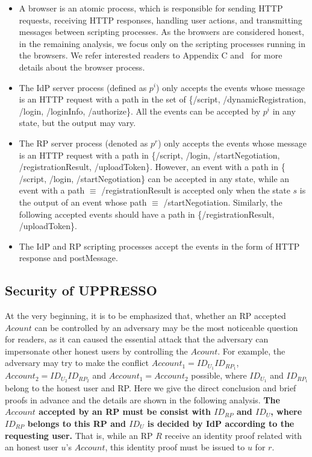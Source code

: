 \begin{itemize}
\item A browser is an atomic process, which is responsible for sending HTTP requests, receiving HTTP responses, handling user actions, and transmitting messages between scripting processes. As the browsers are considered honest, in the remaining analysis, we focus only on the scripting processes running in the browsers. We refer interested readers to Appendix C and~\cite{SPRESSO} for more details about the browser process.
\item The IdP server process (defined as $p^i$) only accepts the events whose message is an HTTP request with a path in the set of {\sf \{/script, /dynamicRegistration, /login, /loginInfo, /authorize\}}. %
All the events can be accepted by $p^i$ in any state, but the output may vary. %
\item The RP server process (denoted as $p^r$) only accepts the events whose message is an HTTP request with a path in {\sf \{/script, /login, /startNegotiation, /registrationResult, /uploadToken\}}. %
However, an event with a path in {\sf \{ /script, /login, /startNegotiation\}} can be accepted in any state, while an event with a path $\equiv$ {\sf /registrationResult} is accepted only when the state $s$ is the output of an event whose path $\equiv$ {\sf /startNegotiation}. Similarly, the following accepted events should have a path in {\sf \{/registrationResult, /uploadToken\}}.
\item The IdP and RP scripting processes accept the events in the form of HTTP response and postMessage. %
\end{itemize}

\subsection{Security of UPPRESSO}
At the very beginning, it is to be emphasized that, whether an RP accepted $Acount$ can be controlled by an adversary may be the most noticeable question for readers, as it can caused the essential attack that the adversary can impersonate other honest users by controlling the $Acount$. For example, the adversary may try to make the conflict $Account_1=ID_{U_1}ID_{RP_1}$, $Account_2=ID_{U_2}ID_{RP_2}$ and $Account_1=Account_2$ possible, where $ID_{U_1}$ and $ID_{RP_1}$ belong to the honest user and RP.
Here we give the direct conclusion and brief proofs in advance and the details are shown in the following analysis. \textbf{The $Account$ accepted by an RP must be consist with $ID_{RP}$ and $ID_U$, where $ID_{RP}$ belongs to this RP and $ID_U$ is decided by IdP according to the requesting user.} That is, while an RP $R$ receive an identity proof related with an honest user $u$'s $Account$, this identity proof must be issued to $u$ for $r$. 

